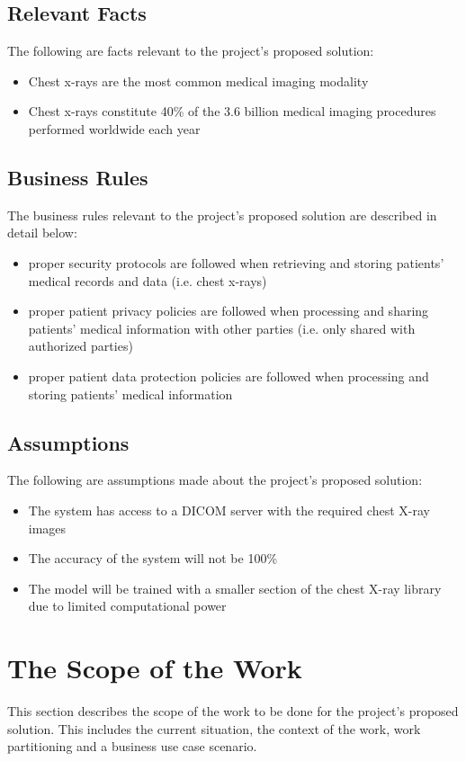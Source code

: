 \documentclass[12pt]{article}
\begin{document}
\subsection{Relevant Facts}
The following are facts relevant to the project's proposed solution:
\begin{itemize}
    \item Chest x-rays are the most common medical imaging modality 
    \item Chest x-rays constitute 40\% of the 3.6 billion medical imaging procedures performed worldwide each year 
\end{itemize}

\subsection{Business Rules}
The business rules relevant to the project's proposed solution are described in detail below:
\begin{itemize}
    \item proper security protocols are followed when retrieving and storing patients' medical records and data (i.e. chest x-rays)
    \item proper patient privacy policies are followed when processing and sharing patients' medical information with other parties (i.e. only shared with authorized parties)
    \item proper patient data protection policies are followed when processing and storing patients' medical information
\end{itemize}

\subsection{Assumptions}
The following are assumptions made about the project's proposed solution:
\begin{itemize}
    \item The system has access to a DICOM server with the required chest X-ray images 
    \item The accuracy of the system will not be 100\%
    \item The model will be trained with a smaller section of the chest X-ray library due to limited computational power
\end{itemize} 

\section{The Scope of the Work}
This section describes the scope of the work to be done for the project's proposed solution. This includes the current situation, the context of the work, work partitioning and a business use case scenario.
\end{document}

